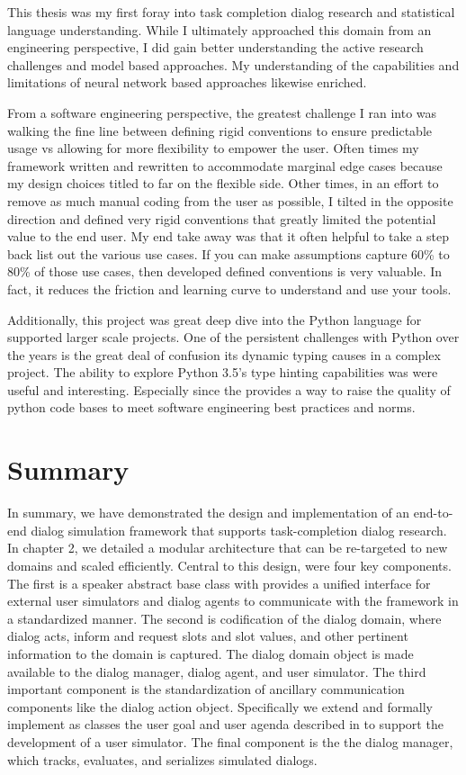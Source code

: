 This thesis was my first foray into task completion dialog research and statistical language understanding. While I ultimately approached this domain from an engineering perspective, I did gain better understanding the active research challenges and model based approaches. My understanding of the capabilities and limitations of neural network based approaches likewise enriched. 

From a software engineering perspective, the greatest challenge I ran into was walking the fine line between defining rigid conventions to ensure predictable usage vs allowing for more flexibility to empower the user. Often times my framework written and rewritten to accommodate marginal edge cases because my design choices titled to far on the flexible side. Other times, in an effort to remove as much manual coding from the user as possible, I tilted in the opposite direction and defined very rigid conventions that greatly limited the potential value to the end user. My end take away was that it often helpful to take a step back list out the various use cases. If you can make assumptions capture 60\% to 80\% of those use cases, then developed defined conventions is very valuable. In fact, it reduces the friction and learning curve to understand and use your tools.

Additionally, this project was great deep dive into the Python language for supported larger scale projects. One of the persistent challenges with Python over the years is the great deal of confusion its dynamic typing causes in a complex project. The ability to explore Python 3.5's type hinting capabilities was were useful and interesting. Especially since the provides a way to raise the quality of python code bases to meet software engineering best practices and norms.

\section{Summary}

In summary, we have demonstrated the design and implementation of an end-to-end dialog simulation framework that supports task-completion dialog research. In chapter 2, we detailed a modular architecture that can be re-targeted to new domains and scaled efficiently. Central to this design, were four key components. The first is a speaker abstract base class with provides a unified interface for external user simulators and dialog agents to communicate with the framework in a standardized manner. The second is codification of the dialog domain, where dialog acts, inform and request slots and slot values, and other pertinent information to the domain is captured. The dialog domain object is made available to the dialog manager, dialog agent, and user simulator. The third important component is the standardization of  ancillary communication components like the dialog action object. Specifically we extend and formally implement as classes the user goal and user agenda described in \cite{Schatzmann2009TheHA} to support the development of a user simulator. The final component is the the dialog manager, which tracks, evaluates, and serializes simulated dialogs. 

